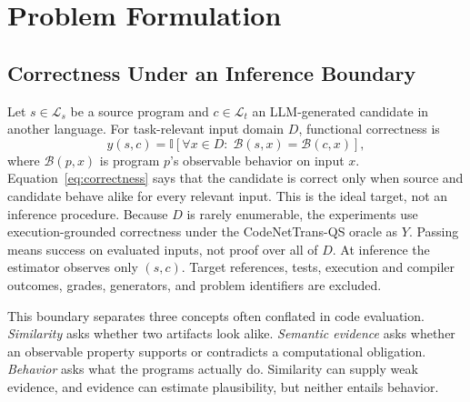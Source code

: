 \documentclass[conference]{IEEEtran}
\begin{document}
\section{Problem Formulation}
\subsection{Correctness Under an Inference Boundary}
Let $s\in\mathcal{L}_s$ be a source program and $c\in\mathcal{L}_t$ an LLM-generated candidate in another language. For task-relevant input domain $D$, functional correctness is
\begin{equation}
y(s,c)=\mathbb{I}\!\left[\forall x\in D:\;\mathcal{B}(s,x)=\mathcal{B}(c,x)\right],
\label{eq:correctness}
\end{equation}
where $\mathcal{B}(p,x)$ is program $p$'s observable behavior on input $x$. Equation~\ref{eq:correctness} says that the candidate is correct only when source and candidate behave alike for every relevant input. This is the ideal target, not an inference procedure. Because $D$ is rarely enumerable, the experiments use execution-grounded correctness under the CodeNetTrans-QS oracle as $Y$. Passing means success on evaluated inputs, not proof over all of $D$. At inference the estimator observes only $(s,c)$. Target references, tests, execution and compiler outcomes, grades, generators, and problem identifiers are excluded.

This boundary separates three concepts often conflated in code evaluation. \emph{Similarity} asks whether two artifacts look alike. \emph{Semantic evidence} asks whether an observable property supports or contradicts a computational obligation. \emph{Behavior} asks what the programs actually do. Similarity can supply weak evidence, and evidence can estimate plausibility, but neither entails behavior.
\end{document}
